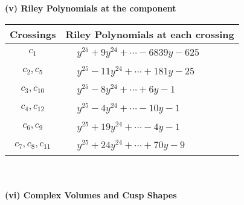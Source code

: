 \documentclass[1p]{elsarticle_modified}
\theoremstyle{definition}
\begin{document}
\newpage\renewcommand{\arraystretch}{1}
\flushleft \textbf{(v) Riley Polynomials at the component}\newline \\
\begin{tabular}{m{50pt}|m{274pt}}
Crossings & \hspace{64pt}Riley Polynomials at each crossing \\
\hline $$\begin{aligned}c_{1}\end{aligned}$$&$\begin{aligned}
&y^{25}+9 y^{24}+\cdots-6839 y-625
\end{aligned}$\\
\hline $$\begin{aligned}c_{2},c_{5}\end{aligned}$$&$\begin{aligned}
&y^{25}-11 y^{24}+\cdots+181 y-25
\end{aligned}$\\
\hline $$\begin{aligned}c_{3},c_{10}\end{aligned}$$&$\begin{aligned}
&y^{25}-8 y^{24}+\cdots+6 y-1
\end{aligned}$\\
\hline $$\begin{aligned}c_{4},c_{12}\end{aligned}$$&$\begin{aligned}
&y^{25}-4 y^{24}+\cdots-10 y-1
\end{aligned}$\\
\hline $$\begin{aligned}c_{6},c_{9}\end{aligned}$$&$\begin{aligned}
&y^{25}+19 y^{24}+\cdots-4 y-1
\end{aligned}$\\
\hline $$\begin{aligned}c_{7},c_{8},c_{11}\end{aligned}$$&$\begin{aligned}
&y^{25}+24 y^{24}+\cdots+70 y-9
\end{aligned}$\\
\hline
\end{tabular}\\~\\
\newpage\flushleft \textbf{(vi) Complex Volumes and Cusp Shapes}
\end{document}
